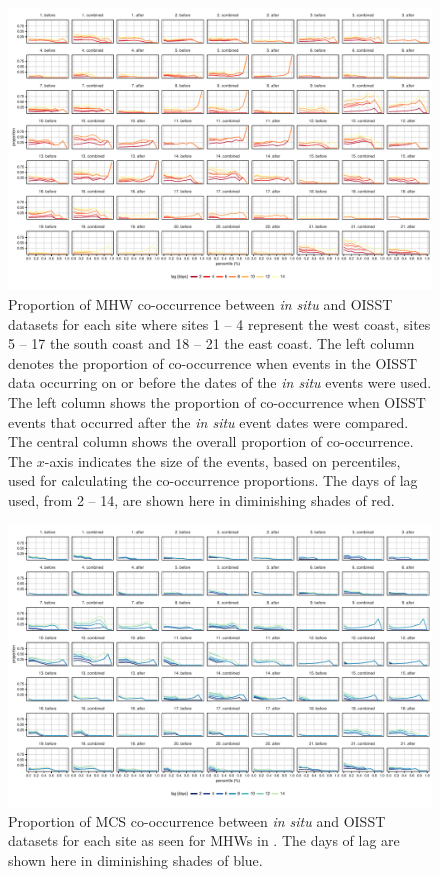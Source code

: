 \documentclass[a4paper,10pt,review]{elsarticle}
\begin{document}
\begin{figure}
\centering 
\includegraphics[width=1.0\textwidth]{figure4.pdf}
\caption{Proportion of MHW co-occurrence between \emph{in situ} and OISST datasets for each site where sites 1 -- 4 represent the west coast, sites 5 -- 17 the south coast and 18 -- 21 the east coast. The left column denotes the proportion of co-occurrence when events in the OISST data occurring on or before the dates of the \emph{in situ} events were used. The left column shows the proportion of co-occurrence when OISST events that occurred after the \emph{in situ} event dates were compared. The central column shows the overall proportion of co-occurrence. The $x$-axis indicates the size of the events, based on percentiles, used for calculating the co-occurrence proportions. The days of lag used, from 2 -- 14, are shown here in diminishing shades of red.} 
\label{fig:Figure4}
\end{figure}

\begin{figure}
\centering 
\includegraphics[width=1.0\textwidth]{figure5.pdf}
\caption{Proportion of MCS co-occurrence between \emph{in situ} and OISST datasets for each site as seen for MHWs in . The days of lag are shown here in diminishing shades of blue.} 
\label{fig:Figure5}
\end{figure}
\end{document}
